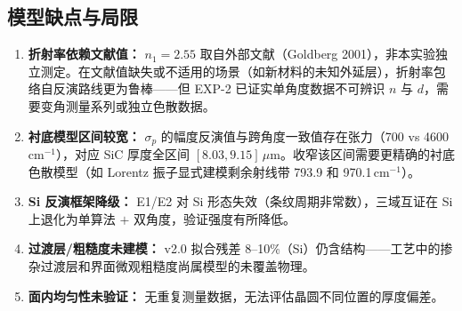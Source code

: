 \subsection{模型缺点与局限}

\begin{enumerate}[itemindent=2em]
\item \textbf{折射率依赖文献值：} $n_1=2.55$ 取自外部文献（Goldberg 2001），非本实验独立测定。在文献值缺失或不适用的场景（如新材料的未知外延层），折射率包络自反演路线更为鲁棒——但 EXP-2 已证实单角度数据不可辨识 $n$ 与 $d$，需要变角测量系列或独立色散数据。

\item \textbf{衬底模型区间较宽：} $\sigma_p$ 的幅度反演值与跨角度一致值存在张力（700 vs 4600\,cm$^{-1}$），对应 SiC 厚度全区间 $[8.03,9.15]\,\mu$m。收窄该区间需要更精确的衬底色散模型（如 Lorentz 振子显式建模剩余射线带 793.9 和 970.1\,cm$^{-1}$）。

\item \textbf{Si 反演框架降级：} E1/E2 对 Si 形态失效（条纹周期非常数），三域互证在 Si 上退化为单算法 $+$ 双角度，验证强度有所降低。

\item \textbf{过渡层/粗糙度未建模：} v2.0 拟合残差 8--10\%（Si）仍含结构——工艺中的掺杂过渡层和界面微观粗糙度尚属模型的未覆盖物理。

\item \textbf{面内均匀性未验证：} 无重复测量数据，无法评估晶圆不同位置的厚度偏差。
\end{enumerate}